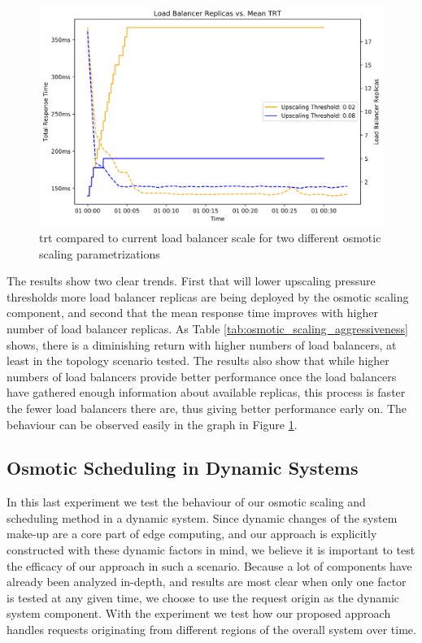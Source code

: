 \documentclass[draft,final]{vutinfth} %
\begin{document}
\begin{figure}
    \centering
    \includegraphics[width=12cm]{graphics/graphs/osmotic_optim_thres_vs_trt.png}
    \caption{\gls{trt} compared to current load balancer scale for two different osmotic scaling parametrizations}
    \label{fig:osmotic_trt_vs_replica_scale}
\end{figure}

The results show two clear trends.
First that will lower upscaling pressure thresholds more load balancer replicas are being deployed by the osmotic scaling component, and second that the mean response time improves with higher number of load balancer replicas.
As Table \ref{tab:osmotic_scaling_aggressiveness} shows, there is a diminishing return with higher numbers of load balancers, at least in the topology scenario tested.
The results also show that while higher numbers of load balancers provide better performance once the load balancers have gathered enough information about available replicas, this process is faster the fewer load balancers there are, thus giving better performance early on.
The behaviour can be observed easily in the graph in Figure \ref{fig:osmotic_trt_vs_replica_scale}.
\subsection{Osmotic Scheduling in Dynamic Systems}
In this last experiment we test the behaviour of our osmotic scaling and scheduling method in a dynamic system.
Since dynamic changes of the system make-up are a core part of edge computing, and our approach is explicitly constructed with these dynamic factors in mind, we believe it is important to test the efficacy of our approach in such a scenario.
Because a lot of components have already been analyzed in-depth, and results are most clear when only one factor is tested at any given time, we choose to use the request origin as the dynamic  system component.
With the experiment we test how our proposed approach handles requests originating from different regions of the overall system over time.
\end{document}
